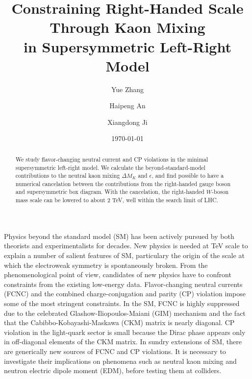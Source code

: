 \documentclass[prd,aps,preprint,tightenlines,superscriptaddress]{revtex4}
\begin{document}
\title{Constraining Right-Handed Scale Through Kaon Mixing \\in Supersymmetric Left-Right Model}
\author{Yue Zhang}
\author{Haipeng An}
\author{Xiangdong Ji}
  
\date{\today}
\begin{abstract}
We study flavor-changing neutral current and CP violations in the minimal supersymmetric
left-right model. We calculate the beyond-standard-model contributions to the neutral
kaon mixing $\Delta M_K$ and $\epsilon$, and find possible to have a numerical cancelation
between the contributions from the right-handed gauge boson and supersymmetric box
diagram. With the cancelation, the right-handed $W$-boson mass
scale can be lowered to about 2 TeV, well within the search limit of LHC.


\end{abstract}
\maketitle


Physics beyond the standard model (SM) has been actively pursued by both theorists and
experimentalists for decades. New physics is needed at TeV scale to explain a number of
salient features of SM, particulary the origin of the scale at which the electroweak
symmetry is spontaneously broken. From the phenomenological point of view, candidates of
new physics have to confront constraints from the existing low-energy data. Flavor-changing 
neutral currents (FCNC) and the combined charge-conjugation and parity (CP)
violation impose some of the most stringent constraints. In the SM, FCNC is highly
suppressed due to the celebrated Glashow-Iliopoulos-Maiani (GIM) mechanism and the fact
that the Cabibbo-Kobayashi-Maskawa (CKM) matrix is nearly diagonal. CP violation in the light-quark 
sector is small because the Dirac phase appears only in off-diagonal elements of
the CKM matrix. In sundry extensions of SM, there are generically new sources of FCNC and
CP violations. It is necessary to investigate their implications on phenomena such as
neutral kaon mixing and neutron electric dipole moment (EDM), before testing them at
colliders.
\end{document}
